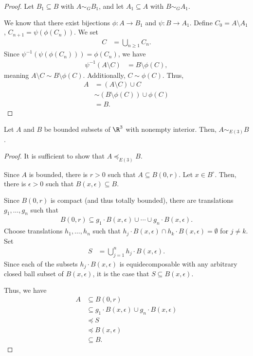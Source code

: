\documentclass[10pt]{mypackage}
\begin{document}
\begin{proof}
  Let $B_1\subseteq B$ with $A\sim_{G} B_1$, and let $A_1\subseteq A$ with $B\sim_{G} A_1$.\newline

  We know that there exist bijections $\phi: A\rightarrow B_1$ and $\psi: B\rightarrow A_1$. Define $C_0 = A\setminus A_1$, $C_{n+1} = \psi\left(\phi\left(C_n\right)\right)$. We set
  \begin{align*}
    C &= \bigcup_{n\geq 1} C_n.
  \end{align*}
  Since $\psi^{-1}\left(\psi\left(\phi\left(C_n\right)\right)\right) = \phi\left(C_n\right)$, we have
  \begin{align*}
    \psi^{-1}\left(A\setminus C\right) &= B\setminus \phi(C),
  \end{align*}
  meaning $A\setminus C \sim B\setminus \phi(C)$. Additionally, $C\sim \phi(C)$. Thus,
  \begin{align*}
    A &= \left(A\setminus C\right)\cup C\\
      &\sim \left(B\setminus \phi(C)\right) \cup \phi(C)\\
      &= B.
  \end{align*}
\end{proof}
\begin{theorem}
  Let $A$ and $B$ be bounded subsets of $\R^3$ with nonempty interior. Then, $A \sim_{E(3)} B$.
\end{theorem}
\begin{proof}
  It is sufficient to show that $A\preceq_{E(3)} B$.\newline

  Since $A$ is bounded, there is $r > 0$ such that $A\subseteq B(0,r)$. Let $x\in B^{\circ}$. Then, there is $\epsilon > 0$ such that $B(x,\epsilon)\subseteq B$.\newline

  Since $B(0,r)$ is compact (and thus totally bounded), there are translations $g_1,\dots,g_n$ such that
  \begin{align*}
    B(0,r)\subseteq g_1\cdot B(x,\epsilon) \cup \cdots \cup g_n\cdot B(x,\epsilon).
  \end{align*}
  Choose translations $h_1,\dots,h_n$ such that $h_j\cdot B(x,\epsilon)\cap h_k\cdot B(x,\epsilon) = \emptyset$ for $j\neq k$. Set
  \begin{align*}
    S &= \bigcup_{j=1}^{n}h_j\cdot B(x,\epsilon).
  \end{align*}
  Since each of the subsets $h_j\cdot B(x,\epsilon)$ is equidecomposable with any arbitrary closed ball subset of $B(x,\epsilon)$, it is the case that $S\subseteq B(x,\epsilon)$.\newline

  Thus, we have
  \begin{align*}
    A &\subseteq B(0,r)\\
      &\subseteq g_1\cdot B(x,\epsilon)\cup g_n\cdot B(x,\epsilon)\\
      &\preceq S\\
      &\preceq B(x,\epsilon)\\
      &\subseteq B.
  \end{align*}
\end{proof}
\end{document}
